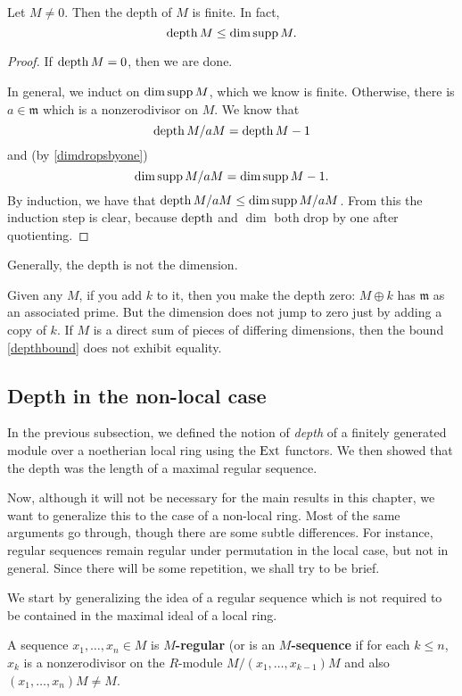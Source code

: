 \begin{corollary} Let $M \neq 0$. Then the depth of $M$ is finite. In fact,
\begin{equation} \label{depthbound} \operatorname{depth} M \leq \dim \operatorname{supp} M.  \end{equation}
\end{corollary}
\begin{proof}
If $\operatorname{depth} M = 0$, then we are done.

In general, we induct on $\dim \operatorname{supp} M$, which we know is
finite. Otherwise,
there is $ a \in \mathfrak{m}$ which is a nonzerodivisor on $M$.
We know that
\[ \operatorname{depth} M/aM = \operatorname{depth} M -1  \]
and (by \cref{dimdropsbyone})
\[ \dim \operatorname{supp} M/aM = \dim \operatorname{supp} M -1.  \]
By induction, we have that $\operatorname{depth} M/aM \leq \dim \operatorname{supp} M/aM$.
From this the
induction step is clear, because $\operatorname{depth}$ and $\dim$ both drop by one after
quotienting.
\end{proof}

Generally, the depth is not the dimension.
\begin{example}
Given any $M$, if you add $k$ to it, then you make the depth
zero: $M \oplus k$
has $\mathfrak{m}$ as an associated prime. But the dimension
 does not
jump to zero just by adding a copy of $k$. If $M$ is a direct sum of pieces of
differing dimensions, then the bound \eqref{depthbound} does not exhibit
equality.
\end{example}

\subsection{Depth in the non-local case}

In the previous subsection, we defined the notion of \emph{depth} of a
finitely generated module over a noetherian local ring using the $\operatorname{Ext}$
functors. We then showed that the depth was the length of a maximal regular
sequence. 

Now, although it will not be necessary for the main results in this chapter, we want to generalize this to the case of a non-local ring. Most of the
same arguments go through, though there are some subtle differences. For
instance, regular sequences remain regular under permutation in the local
case, but not in general. Since there will be some repetition, we shall try to
be brief.

We start by generalizing the idea of a regular sequence which is not required
to be contained in the maximal ideal of a local ring.
\begin{definition} 
A sequence $x_1, \dots, x_n \in M$ is \textbf{$M$-regular} (or is an
\textbf{$M$-sequence} if for each $k \leq n$, $x_k$ is a nonzerodivisor on the
$R$-module $M/(x_1, \dots, x_{k-1}) M$ and also $(x_1, \dots, x_n) M \neq M$. 	\end{definition} 

